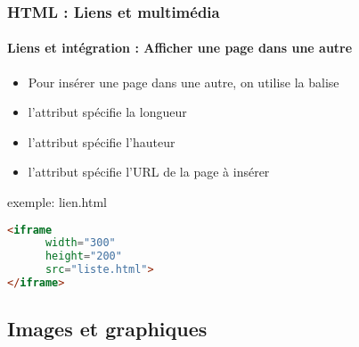 \documentclass[xcolor=table]{beamer}
\begin{document}
\begin{frame}[fragile]
\frametitle{HTML : Liens et multimédia}
\framesubtitle{Liens et intégration : Afficher une page dans une autre}

\begin{minipage}{0.50\textwidth} 
	\begin{itemize}
		\item Pour insérer une page dans une autre, on utilise la balise 
		\item l'attribut  spécifie la longueur 
		\item l'attribut  spécifie l'hauteur 
		\item l'attribut  spécifie l'URL de la page à insérer
	\end{itemize}
\end{minipage}
%
\begin{minipage}{0.49\textwidth}
\begin{exampleblock}{exemple: lien.html}
\lstset{escapeinside=**}
\scriptsize\bfseries\vspace{-6pt}
\begin{lstlisting}[language={html}]
<iframe 
      width="300" 
      height="200" 
      src="liste.html">
</iframe>	
\end{lstlisting}\vspace{-6pt}
\end{exampleblock}
\end{minipage}

\end{frame}

\subsection{Images et graphiques}
\end{document}
